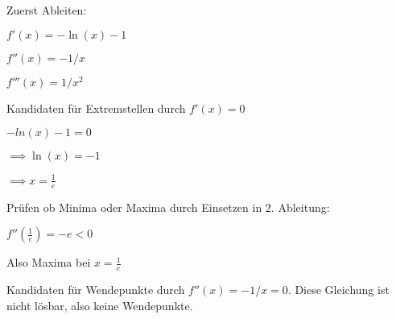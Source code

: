 \item

Zuerst Ableiten:

$f'(x) = -\ln(x)-1$

$f''(x) = -1/x$

$f'''(x) = 1/x^2$

Kandidaten für Extremstellen durch $f'(x) = 0$

$-ln(x) - 1 = 0$

$\implies \ln(x) = -1$

$\implies x = \frac{1}{e}$

Prüfen ob Minima oder Maxima durch Einsetzen in 2. Ableitung:

$f''(\frac{1}{e}) = -e < 0 $

Also Maxima bei $x=\frac{1}{e}$

Kandidaten für Wendepunkte durch $f''(x) = -1/x = 0$. Diese Gleichung ist nicht lösbar, also keine Wendepunkte.

